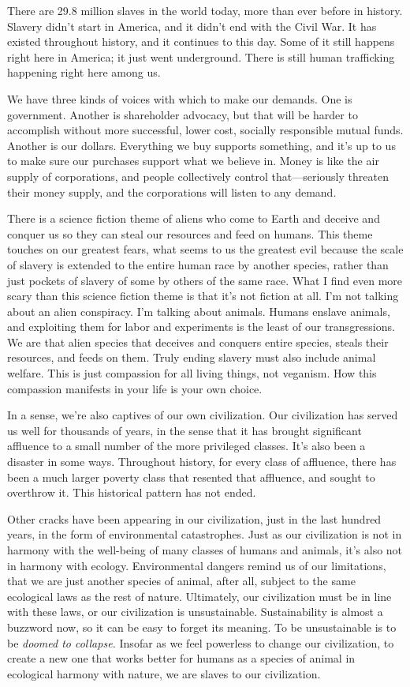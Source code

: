 There are 29.8 million slaves in the world today, more than ever before in history.\cite{washington-post-slave-map} Slavery didn't start in America, and it didn't end with the Civil War. It has existed throughout history, and it continues to this day. Some of it still happens right here in America; it just went underground. There is still human trafficking happening right here among us.

We have three kinds of voices with which to make our demands. One is government. Another is shareholder advocacy, but that will be harder to accomplish without more successful, lower cost, socially responsible mutual funds. Another is our dollars. Everything we buy supports something, and it's up to us to make sure our purchases support what we believe in. Money is like the air supply of corporations, and people collectively control that---seriously threaten their money supply, and the corporations will listen to any demand.

There is a science fiction theme of aliens who come to Earth and deceive and conquer us so they can steal our resources and feed on humans. This theme touches on our greatest fears, what seems to us the greatest evil because the scale of slavery is extended to the entire human race by another species, rather than just pockets of slavery of some by others of the same race. What I find even more scary than this science fiction theme is that it's not fiction at all. I'm not talking about an alien conspiracy. I'm talking about animals. Humans enslave animals, and exploiting them for labor and experiments is the least of our transgressions. We are that alien species that deceives and conquers entire species, steals their resources, and feeds on them. Truly ending slavery must also include animal welfare. This is just compassion for all living things, not veganism. How this compassion manifests in your life is your own choice.

In a sense, we're also captives of our own civilization. Our civilization has served us well for thousands of years, in the sense that it has brought significant affluence to a small number of the more privileged classes. It's also been a disaster in some ways. Throughout history, for every class of affluence, there has been a much larger poverty class that resented that affluence, and sought to overthrow it. This historical pattern has not ended.

Other cracks have been appearing in our civilization, just in the last hundred years, in the form of environmental catastrophes. Just as our civilization is not in harmony with the well-being of many classes of humans and animals, it's also not in harmony with ecology. Environmental dangers remind us of our limitations, that we are just another species of animal, after all, subject to the same ecological laws as the rest of nature. Ultimately, our civilization must be in line with these laws, or our civilization is unsustainable. Sustainability is almost a buzzword now, so it can be easy to forget its meaning. To be unsustainable is to be \emph{doomed to collapse.} Insofar as we feel powerless to change our civilization, to create a new one that works better for humans as a species of animal in ecological harmony with nature, we are slaves to our civilization.

